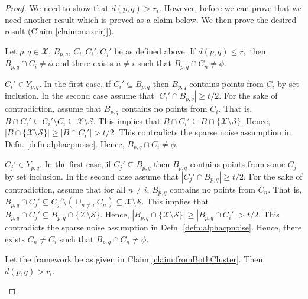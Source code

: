 \documentclass[11pt]{article}
\newcommand{\mc}{\mathcal}
\begin{document}
\begin{proof}
We need to show that $d(p, q) > r_i$. However, before we can prove that we need another result which is proved as a claim below. We then prove the desired result (Claim \ref{claim:maxrirj}).
\begin{claim}
\label{claim:fromBothCluster}
Let $p, q \in \mc X$, $B_{p, q}$, $C_i, C_i', C_j'$ be as defined above. If $d(p, q) \le r,$ then $B_{p, q} \cap C_i \neq \phi$ and there exists $n \neq i$ such that $B_{p, q} \cap C_n \neq \phi$.
\end{claim}
\vspace{-0.1in} $C_i' \in Y_{p, q}$. In the first case, if $C_i' \subseteq B_{p, q}$ then $B_{p,q}$ contains points from $C_i$ by set inclusion. In the second case assume that $|C_i' \cap B_{p,q}| \ge t/2$. For the sake of contradiction, assume that $B_{p, q}$ contains no points from $C_i$. That is, $B \cap C_i' \subseteq C_i' \setminus C_i \subseteq \mc X \setminus \mc S$. This implies that $B \cap C_i' \subseteq B \cap \{\mc X \setminus \mc S\}$. Hence, $|B\cap \{\mc X \setminus \mc S\}| \ge |B \cap C_i'| > t/2$. This contradicts the sparse noise assumption in Defn. \ref{defn:alphacpnoise}. Hence, $B_{p, q} \cap C_i \neq \phi$.

$C_j' \in Y_{p, q}$. In the first case, if $C_j' \subseteq B_{p, q}$ then $B_{p,q}$ contains points from some $C_j$ by set inclusion. In the second case assume that $|C_j' \cap B_{p,q}| \ge t/2$. For the sake of contradiction, assume that for all $n \neq i$, $B_{p, q}$ contains no points from $C_n$. That is, $B_{p, q} \cap C_j' \subseteq C_j' \setminus (\cup_{n \neq i} C_n) \subseteq \mc X \setminus \mc S$. This implies that $B_{p, q} \cap C_j' \subseteq B_{p,q} \cap \{\mc X \setminus \mc S\}$. Hence, $|B_{p, q}\cap \{\mc X \setminus \mc S\}| \ge |B_{p,q} \cap C_i'| > t/2$. This contradicts the sparse noise assumption in Defn. \ref{defn:alphacpnoise}. Hence, there exists $C_n \neq C_i$ such that $B_{p, q} \cap C_n \neq \phi$.

\begin{claim}
\label{claim:maxrirj}
Let the framework be as given in Claim \ref{claim:fromBothCluster}. Then, $d(p, q) > r_i$.
\end{claim}


\end{proof}
\end{document}
